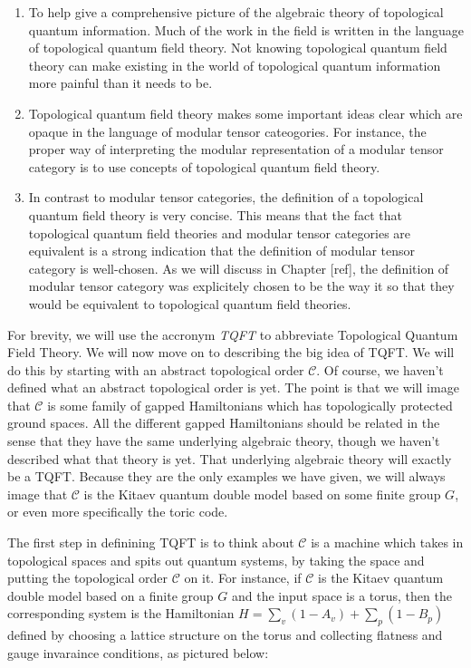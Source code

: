 \documentclass{article}
\theoremstyle{definition}
\newcommand{\C}{\mathscr{C}}
\newcommand{\0}{\left|0\right>}
\newcommand{\1}{\left|1\right>}
\numberwithin{figure}{section}
\begin{document}
\begin{enumerate}
\item To help give a comprehensive picture of the algebraic theory of topological quantum information. Much of the work in the field is written in the language of topological quantum field theory. Not knowing topological quantum field theory can make existing in the world of topological quantum information more painful than it needs to be.

\item Topological quantum field theory makes some important ideas clear which are opaque in the language of modular tensor cateogories. For instance, the proper way of interpreting the modular representation of a modular tensor category is to use concepts of topological quantum field theory.

\item In contrast to modular tensor categories, the definition of a topological quantum field theory is very concise. This means that the fact that topological quantum field theories and modular tensor categories are equivalent is a strong indication that the definition of modular tensor category is well-chosen. As we will discuss in Chapter [ref], the definition of modular tensor category was explicitely chosen to be the way it so that they would be equivalent to topological quantum field theories.
\end{enumerate}

For brevity, we will use the accronym \textit{TQFT} to abbreviate Topological Quantum Field Theory. We will now move on to describing the big idea of TQFT. We will do this by starting with an abstract topological order $\C$. Of course, we haven't defined what an abstract topological order is yet. The point is that we will image that $\C$ is some family of gapped Hamiltonians which has topologically protected ground spaces. All the different gapped Hamiltonians should be related in the sense that they have the same underlying algebraic theory, though we haven't described what that theory is yet. That underlying algebraic theory will exactly be a TQFT. Because they are the only examples we have given, we will always image that $\C$ is the Kitaev quantum double model based on some finite group $G$, or even more specifically the toric code.

The first step in definining TQFT is to think about $\C$ is a machine which takes in topological spaces and spits out quantum systems, by taking the space and putting the topological order $\C$ on it. For instance, if $\C$ is the Kitaev quantum double model based on a finite group $G$ and the input space is a torus, then the corresponding system is the Hamiltonian $H=\sum_{v}(1-A_v)+\sum_{p}(1-B_p)$ defined by choosing a lattice structure on the torus and collecting flatness and gauge invaraince conditions, as pictured below:
\end{document}
